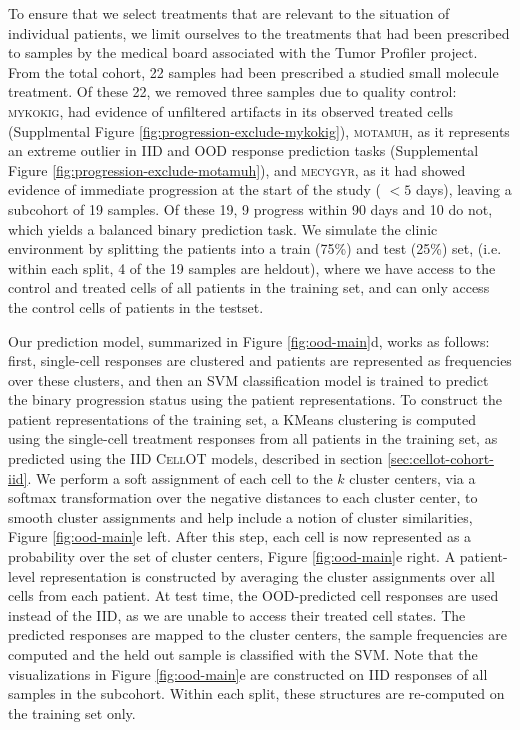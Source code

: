 To ensure that we select treatments that are relevant to the situation of individual patients, we limit ourselves to the treatments that had been prescribed to samples by the medical board associated with the Tumor Profiler project.
From the total cohort, 22 samples had been prescribed a studied small molecule treatment.
Of these 22, we removed three samples due to quality control: \textsc{mykokig}, had evidence of unfiltered artifacts in its observed treated cells (Supplmental Figure \ref{fig:progression-exclude-mykokig}), \textsc{motamuh}, as it represents an extreme outlier in IID and OOD response prediction tasks (Supplemental Figure \ref{fig:progression-exclude-motamuh}), and \textsc{mecygyr}, as it had showed evidence of immediate progression at the start of the study ( $< 5$ days), leaving a subcohort of 19 samples.
Of these 19, 9 progress within 90 days and 10 do not, which yields a balanced binary prediction task.
We simulate the clinic environment by splitting the patients into a train (75\%) and test (25\%) set, (i.e. within each split, 4 of the 19 samples are heldout), where we have access to the control and treated cells of all patients in the training set, and can only access the control cells of patients in the testset.

Our prediction model, summarized in Figure \ref{fig:ood-main}d, works as follows: first, single-cell responses are clustered and patients are represented as frequencies over these clusters, and then an SVM classification model is trained to predict the binary progression status using the patient representations.
To construct the patient representations of the training set, a KMeans clustering is computed using the single-cell treatment responses from all patients in the training set, as predicted using the IID \textsc{CellOT} models, described in section \ref{sec:cellot-cohort-iid}.
We perform a soft assignment of each cell to the $k$ cluster centers, via a softmax transformation over the negative distances to each cluster center, to smooth cluster assignments and help include a notion of cluster similarities, Figure \ref{fig:ood-main}e left.
After this step, each cell is now represented as a probability over the set of cluster centers, Figure \ref{fig:ood-main}e right.
A patient-level representation is constructed by averaging the cluster assignments over all cells from each patient.
At test time, the OOD-predicted cell responses are used instead of the IID, as we are unable to access their treated cell states.
The predicted responses are mapped to the cluster centers, the sample frequencies are computed and the held out sample is classified with the SVM.
Note that the visualizations in Figure \ref{fig:ood-main}e are constructed on IID responses of all samples in the subcohort.
Within each split, these structures are re-computed on the training set only.

